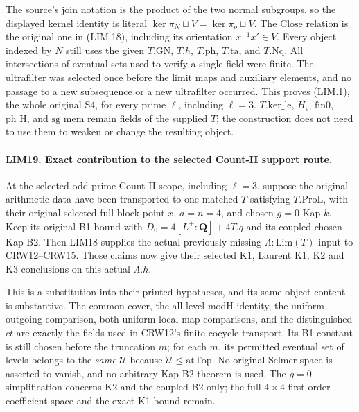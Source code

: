 The source's join notation is the product of the two normal
subgroups, so the displayed kernel identity is literal
\(\ker\pi_N\sqcup V=\ker\pi_o\sqcup V\).
The \(\mathrm{Close}\) relation is the original one in (LIM.18),
including its orientation \(x^{-1}x'\in V\).
Every object indexed by \(N\) still uses the given
\(T.\mathrm{GN}\), \(T.h\), \(T.\mathrm{ph}\),
\(T.\mathrm{ta}\), and \(T.\mathrm{Nq}\).
All intersections of eventual sets used to verify a single field
were finite.  The ultrafilter was selected once before the limit
maps and auxiliary elements, and no passage to a new subsequence
or a new ultrafilter occurred.
This proves (LIM.1), the whole original \(\mathrm{S4}\), for every
prime \(\ell\), including \(\ell=3\).
\(T.\mathrm{ker\_le}\), \(H_\epsilon\), \(\mathrm{fin0}\),
\(\mathrm{ph\_H}\), and \(\mathrm{sg\_mem}\) remain fields of
the supplied \(T\); the construction does not need to use them
to weaken or change the resulting object.

\paragraph{LIM19. Exact contribution to the selected Count-II support route.}
\label{claim:LIM19}
At the selected odd-prime Count-II scope, including \(\ell=3\),
suppose the original arithmetic data have been transported to one
matched \(T\) satisfying \(T.\mathrm{ProL}\), with their original
selected full-block point \(x\), \(a=n=4\), and chosen \(g=0\)
Kap \(k\).  Keep its original B1 bound with
\(D_0=4[L^+:\mathbf Q]+4T.q\) and its coupled chosen-Kap B2.
Then LIM18 supplies the actual previously missing
\(\Lambda:\mathrm{Lim}(T)\) input to CRW12--CRW15.
Those claims now give their selected K1, Laurent K1, K2 and K3
conclusions on this actual \(\Lambda.h\).

This is a substitution into their printed hypotheses, and its
same-object content is substantive.  The common cover, the all-level
\(\mathrm{modH}\) identity, the uniform outgoing comparison,
both uniform local-map comparisons, and the distinguished \(ct\)
are exactly the fields used in CRW12's finite-cocycle transport.
Its B1 constant is still chosen before the truncation \(m\);
for each \(m\), its permitted eventual set of levels belongs to
the \emph{same} \(\mathcal U\) because
\(\mathcal U\le\mathrm{atTop}\).
No original Selmer space is asserted to vanish, and no arbitrary
Kap B2 theorem is used.  The \(g=0\) simplification concerns
K2 and the coupled B2 only; the full \(4\times4\) first-order
coefficient space and the exact K1 bound remain.

